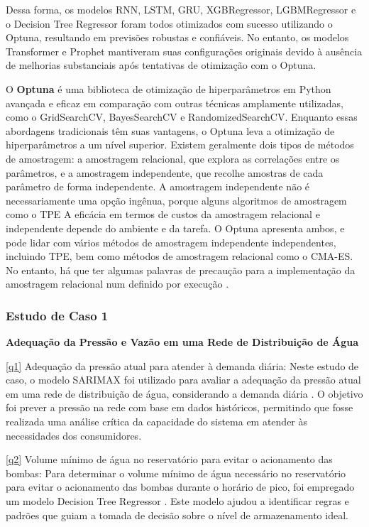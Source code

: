Dessa forma, os modelos RNN, LSTM, GRU, XGBRegressor, LGBMRegressor e o Decision Tree Regressor foram todos otimizados com sucesso utilizando o Optuna, resultando em previsões robustas e confiáveis. No entanto, os modelos Transformer e Prophet mantiveram suas configurações originais devido à ausência de melhorias substanciais após tentativas de otimização com o Optuna.

O \textbf{Optuna} é uma biblioteca de otimização de hiperparâmetros em Python avançada e eficaz em comparação com outras técnicas amplamente utilizadas, como o GridSearchCV, BayesSearchCV e RandomizedSearchCV. Enquanto essas abordagens tradicionais têm suas vantagens, o Optuna leva a otimização de hiperparâmetros a um nível superior.
Existem geralmente dois tipos de métodos de amostragem: a amostragem relacional, que explora as correlações entre os parâmetros, e a amostragem independente, que recolhe amostras de cada parâmetro de forma independente. A amostragem independente não é necessariamente uma opção ingênua, porque alguns algoritmos de amostragem como o TPE A eficácia em termos de custos da amostragem relacional e independente depende do ambiente e da tarefa. O Optuna apresenta ambos, e pode lidar com vários métodos de amostragem independente independentes, incluindo TPE, bem como métodos de amostragem relacional como o CMA-ES. No entanto, há que ter algumas palavras de precaução para a implementação da amostragem relacional num definido por execução \cite{DBLP}.


\subsubsection{Estudo de Caso 1}

\noindent\textbf{Adequação da Pressão e Vazão em uma Rede de Distribuição de Água}

\eqref{q1} Adequação da pressão atual para atender à demanda diária: Neste estudo de caso, o modelo SARIMAX  foi utilizado para avaliar a adequação da pressão atual em uma rede de distribuição de água, considerando a demanda diária \cite{2-s2.0-85099424908}. O objetivo foi prever a pressão na rede com base em dados históricos, permitindo que fosse realizada uma análise crítica da capacidade do sistema em atender às necessidades dos consumidores.

\eqref{q2} Volume mínimo de água no reservatório para evitar o acionamento das bombas: Para determinar o volume mínimo de água necessário no reservatório para evitar o acionamento das bombas durante o horário de pico, foi empregado um modelo Decision Tree Regressor  \cite{2-s2.0-85054695177}. Este modelo ajudou a identificar regras e padrões que guiam a tomada de decisão sobre o nível de armazenamento ideal.

